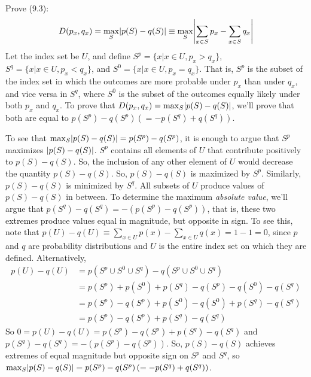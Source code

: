  Prove (9.3): $$D(p_x,q_x) = \max_{S}\abs{p(S)-q(S)} \equiv \max_{S}\abs{\sum_{x\in S}p_x-\sum_{x\in S}q_x}$$
\Soln Let the index set be $U$, and define $S^p = \{x| x\in U, p_x > q_x\}$, $S^q = \{x| x\in U, p_x < q_x\}$, and $S^0 = \{x| x\in U, p_x = q_x\}$.  That is, $S^p$ is the subset of the index set in which the outcomes are more probable under $p_x$ than under $q_x$, and vice versa in $S^q$, where $S^0$ is the subset of the outcomes equally likely under both $p_x$ and $q_x$.  To prove that $D(p_x,q_x) = \max_{S}\abs{p(S)-q(S)}$, we'll prove that both are equal to $p(S^p)-q(S^p) \left(=-p(S^q)+q(S^q)\right)$.

To see that $\max_{S}\abs{p(S)-q(S)} = p(S^p)-q(S^p)$, it is enough to argue that $S^p$ maximizes $\left\lvert p(S)-q(S)\right\rvert$.  $S^p$ contains all elements of $U$ that contribute positively to $p(S)-q(S)$.  So, the inclusion of any other element of $U$ would decrease the quantity $p(S)-q(S)$.  So, $p(S)-q(S)$ is maximized by $S^p$.  Similarly, $p(S)-q(S)$ is minimized by $S^q$.  All subsets of $U$ produce values of $p(S)-q(S)$ in between. To determine the maximum {\em absolute value}, we'll argue that $p(S^q)-q(S^q) = -(p(S^p)-q(S^p))$, that is, these two extremes produce values equal in magnitude, but opposite in sign.  To see this, note that $p(U)-q(U) \equiv \sum_{x\in U} p(x) - \sum_{x\in U}q(x) = 1 - 1 = 0$, since $p$ and $q$ are probability distributions and $U$ is the entire index set on which they are defined.  Alternatively, 
\begin{align*} p(U)-q(U) &= p(S^p\cup S^0 \cup S^q) - q(S^p\cup S^0 \cup S^q) \tag{set equality}\\
& = p(S^p) + p(S^0) + p(S^q) - q(S^p) - q(S^0) - q(S^q) \tag{separate implicit sums} \\
&= p(S^p)-q(S^p) + p(S^0)-q(S^0) + p(S^q)-q(S^q) \tag{rearrange}\\
&= p(S^p)-q(S^p) + p(S^q)-q(S^q) \tag{$p_x=q_x$ for $x\in S^0$} 
\end{align*}
So $0 = p(U)-q(U) =  p(S^p)-q(S^p) + p(S^q)-q(S^q)$ and $p(S^q)-q(S^q) = -(p(S^p)-q(S^p))$.  So, $p(S)-q(S)$ achieves extremes of equal magnitude but opposite sign on $S^p$ and $S^q$, so $\max_{S}\abs{p(S)-q(S)} = p(S^p)-q(S^p) \left(=-p(S^q)+q(S^q)\right)$.

